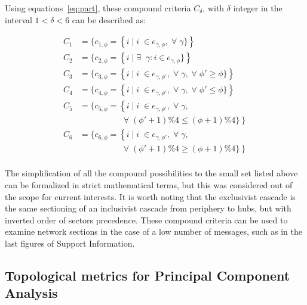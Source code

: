 \documentclass[%
 aip,
 jmp,%
 amsmath,amssymb,
 reprint,%
]{revtex4-1}
\begin{document}
Using equations~\ref{eq:part}, these compound criteria $C_\delta$, with $\delta$ integer in the interval $1<\delta<6$ can be described as:

\begin{equation}
\begin{split}
C_1&=\{c_{1,\phi}=\left\{i\mid i\;\in e_{\gamma,\phi}, \;\forall\; \gamma\}\right\} \\
C_2&=\{c_{2,\phi}=\left\{i\mid \exists \;\;\gamma: i \in e_{\gamma,\phi}\}\right\} \\
C_3&=\{c_{3,\phi}=\left\{i\mid i\;\in e_{\gamma,\phi'}, \;\forall\; \gamma,\;\forall\;\phi'\geq \phi\}\right\} \\
C_4&=\{c_{4,\phi}=\left\{i\mid i\;\in e_{\gamma,\phi'}, \;\forall\; \gamma,\;\forall\;\phi'\leq \phi\}\right\} \\
C_5&=\{c_{5,\phi}=\left\{i\mid i\;\in e_{\gamma,\phi'}, \;\forall\; \gamma,\right.\\
	  &\;\;\;\;\;\;\;\;\;\;\;\;\;\;\;\;\;\; \left.\;\forall\;(\phi'+1)\%4\leq (\phi+1)\%4\}\right\} \\
C_6&=\{c_{6,\phi}=\left\{i\mid i\;\in e_{\gamma,\phi'}, \;\forall\; \gamma,\right.\\
	  &\;\;\;\;\;\;\;\;\;\;\;\;\;\;\;\;\;\; \left.\;\forall\;(\phi'+1)\%4\geq (\phi+1)\%4\}\right\} \\
\end{split}
\end{equation}

The simplification of all the compound possibilities to the small set listed above can be formalized in strict mathematical terms, but this was considered out of the scope for current interests. It is worth noting that the exclusivist cascade is the same sectioning of an inclusivist cascade from periphery to hubs, but with inverted order of sectors precedence. These compound criteria can be used to examine network sections in the case of a low number of messages, such as in the last figures of Support Information.


\subsection{Topological metrics for Principal Component Analysis}\label{measures}
\end{document}
